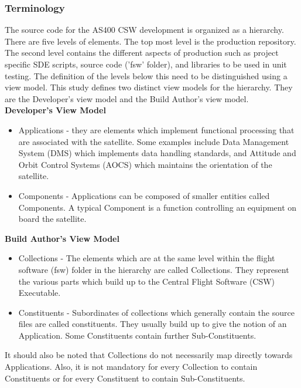 \documentclass[12pt, a4paper, titlepage]{scrartcl}
\begin{document}
\subsubsection{Terminology}
The source code for the AS400 CSW development is organized as a hierarchy. There are five levels of elements. The top most level is the production repository. The second level contains the different aspects of production such as project specific SDE scripts, source code ('fsw' folder), and libraries to be used in unit testing. The definition of the levels below this need to be distinguished using a view model. This study defines two distinct view models\cite{finkelstein1992viewpoints} for the hierarchy. They are the Developer's view model and the Build Author's view model. \\
\textbf{Developer's View Model}
\begin{itemize}
	\item Applications - they are elements which implement functional processing that are associated with the satellite. Some examples include Data Management System (DMS) which implements data handling standards, and Attitude and Orbit Control Systems (AOCS) which maintains the orientation of the satellite.
	\item Components - Applications can be composed of smaller entities called Components. A typical Component is a function controlling an equipment on board the satellite. 
\end{itemize}
\textbf{Build Author's View Model}
\begin{itemize}
	\item Collections - The elements which are at the same level within the flight software (fsw) folder in the hierarchy are called Collections. They represent the various parts which build up to the Central Flight Software (CSW) Executable.
	\item Constituents - Subordinates of collections which generally contain the source files are called constituents. They usually build up to give the notion of an Application. Some Constituents contain further Sub-Constituents.
\end{itemize}
It should also be noted that Collections do not necessarily map directly towards Applications. Also, it is not mandatory for every Collection to contain Constituents or for every Constituent to contain Sub-Constituents. 
\end{document}
